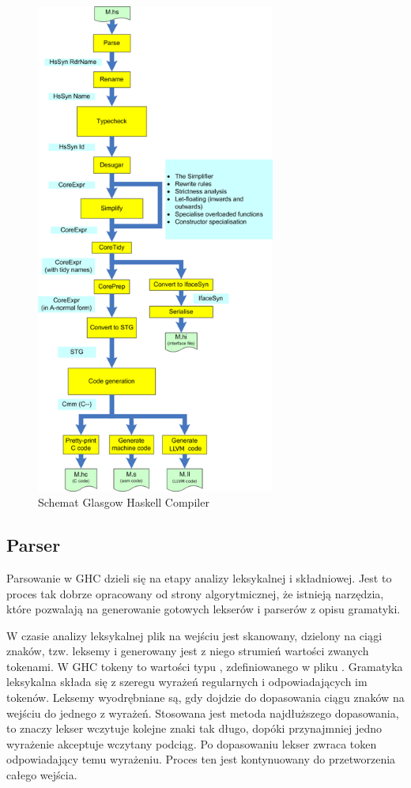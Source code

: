 \begin{figure}[H]
    \centering
    \includegraphics[width=0.7\textwidth]{images/AOSA_compiler}
    \caption[Schemat Glasgow Haskell Compiler]{Schemat Glasgow Haskell Compiler\cite{AOSA}}
    \label{fig:AOSA_compiler}
\end{figure}

\subsection{Parser}\label{sec:parser}
Parsowanie w GHC dzieli się na etapy analizy leksykalnej i składniowej. Jest to
proces tak dobrze opracowany od strony algorytmicznej, że istnieją narzędzia,
które pozwalają na generowanie gotowych lekserów i parserów z opisu gramatyki.

W czasie analizy leksykalnej plik na wejściu jest skanowany, dzielony na ciągi
znaków, tzw. leksemy i generowany jest z niego strumień wartości zwanych tokenami.
W GHC tokeny to wartości typu , zdefiniowanego w pliku .
Gramatyka leksykalna składa się z szeregu wyrażeń regularnych i odpowiadających im tokenów.
Leksemy wyodrębniane są, gdy dojdzie do dopasowania ciągu znaków na wejściu do jednego z wyrażeń.
Stosowana jest metoda najdłuższego dopasowania, to znaczy lekser
wczytuje kolejne znaki tak długo, dopóki przynajmniej jedno wyrażenie akceptuje
wczytany podciąg. Po dopasowaniu lekser zwraca token odpowiadający temu wyrażeniu.
Proces ten jest kontynuowany do przetworzenia całego wejścia.

